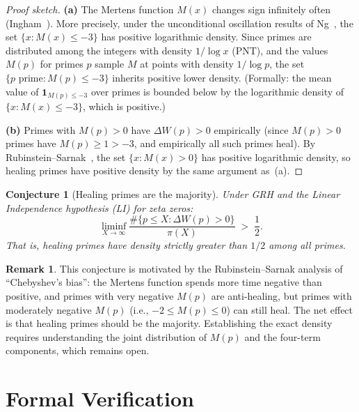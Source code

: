 \documentclass[11pt]{article}
\newtheorem{conjecture}[theorem]{Conjecture}
\theoremstyle{definition}
\newtheorem{remark}[theorem]{Remark}
\begin{document}
\begin{proof}[Proof sketch]
\textbf{(a)} The Mertens function $M(x)$ changes sign infinitely
often (Ingham~\cite{Ingham1942}).  More precisely, under the
unconditional oscillation results of Ng~\cite{Ng2004}, the set
$\{x : M(x) \le -3\}$ has positive logarithmic density.  Since primes
are distributed among the integers with density $1/\log x$ (PNT),
and the values $M(p)$ for primes $p$ sample $M$ at points with
density $1/\log p$, the set $\{p \text{ prime} : M(p) \le -3\}$
inherits positive lower density.  (Formally: the mean value of
$\mathbf{1}_{M(p) \le -3}$ over primes is bounded below by the
logarithmic density of $\{x : M(x) \le -3\}$, which is positive.)

\textbf{(b)} Primes with $M(p) > 0$ have $\Delta W(p) > 0$
empirically (since $M(p) > 0$ primes have $M(p) \ge 1 > -3$, and
empirically all such primes heal).  By Rubinstein--Sarnak~\cite{RubinsteinSarnak1994},
the set $\{x : M(x) > 0\}$ has positive logarithmic density,
so healing primes have positive density by the same argument as~(a).
\end{proof}

\begin{conjecture}[Healing primes are the majority]\label{conj:healing-majority}
Under GRH and the Linear Independence hypothesis (LI) for zeta
zeros:
\[
  \liminf_{X \to \infty}
    \frac{\#\{p \le X : \Delta W(p) > 0\}}{\pi(X)}
  \;>\; \frac{1}{2}.
\]
That is, healing primes have density strictly greater than $1/2$
among all primes.
\end{conjecture}

\begin{remark}
This conjecture is motivated by the Rubinstein--Sarnak analysis of
``Chebyshev's bias'': the Mertens function spends more time negative
than positive, and primes with very negative $M(p)$ are anti-healing,
but primes with moderately negative $M(p)$ (i.e., $-2 \le M(p) \le 0$)
can still heal.  The net effect is that healing primes should be the
majority.  Establishing the exact density requires understanding the
joint distribution of $M(p)$ and the four-term components, which
remains open.
\end{remark}



\section{Formal Verification}\label{sec:lean}
\end{document}
